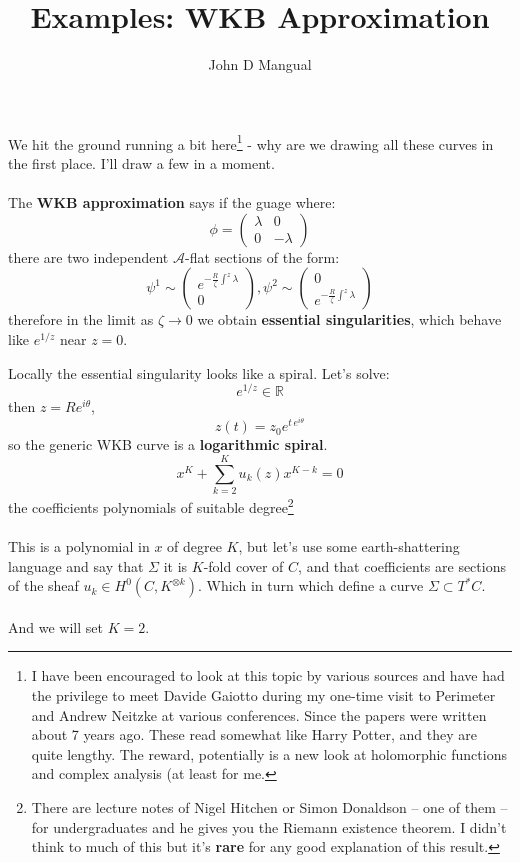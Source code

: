 \documentclass[12pt]{article}
\title{\textbf{ Examples:  WKB Approximation }}
\author{John D Mangual}
\date{}
\begin{document}
\selectfont \fontsize{25}{30}\selectfont

\maketitle

\noindent We hit the ground running a bit here\footnote{I have been encouraged to look at this topic by various sources and have had the privilege to meet Davide Gaiotto during my one-time visit to Perimeter and Andrew Neitzke at various conferences.  Since the papers were written about 7 years ago.  These read somewhat like Harry Potter, and they are quite lengthy.  The reward, potentially is a new look at holomorphic functions and complex analysis (at least for me.} - why are we drawing all these curves in the first place.  I'll draw a few in a moment.  \\ \\
The \textbf{WKB approximation} says if the guage where:
$$ \phi = \left( \begin{array}{cc} 
\lambda & 0 \\ 0 & -\lambda \end{array} \right) $$
there are two independent $\mathcal{A}$-flat sections of the form:
$$\psi^1 \sim \left( \begin{array}{c} 
e^{- \frac{R}{\zeta} \int^z \lambda } \\ 0 \end{array} \right), 
\psi^2 \sim \left( \begin{array}{c} 0 \\ 
e^{- \frac{R}{\zeta} \int^z \lambda }\end{array} \right) $$
therefore in the limit as $\zeta \to 0$ we obtain \textbf{essential singularities}, which behave like $e^{1/z}$ near $z = 0$. 

\newpage

\noindent Locally the essential singularity looks like a spiral.  Let's solve:
$$ e^{1/z} \in \mathbb{R} $$
then $z = R e^{i\theta}$, 
$$ z(t) = z_0 e^{t\, e^{i\theta}} $$
so the generic WKB curve is a \textbf{logarithmic spiral}.
$$ x^K + \sum_{k=2}^K u_k(z) x^{K-k} = 0$$
the coefficients polynomials of suitable degree\footnote{There are lecture notes of Nigel Hitchen or Simon Donaldson -- one of them -- for undergraduates and he gives you the Riemann existence theorem.  I didn't think to much of this but it's \textbf{rare} for any good explanation of this result.} \\ \\
This is a polynomial in $x$ of degree $K$, but let's use some earth-shattering language and say that $\Sigma$ it is $K$-fold cover of $C$, and that coefficients are sections of the sheaf $u_k \in H^0(C, K^{\otimes k})$.  Which in turn which define a curve $\Sigma \subset T^\ast C$. \\ \\ 
And we will set $K = 2$.  \newpage
\end{document}
